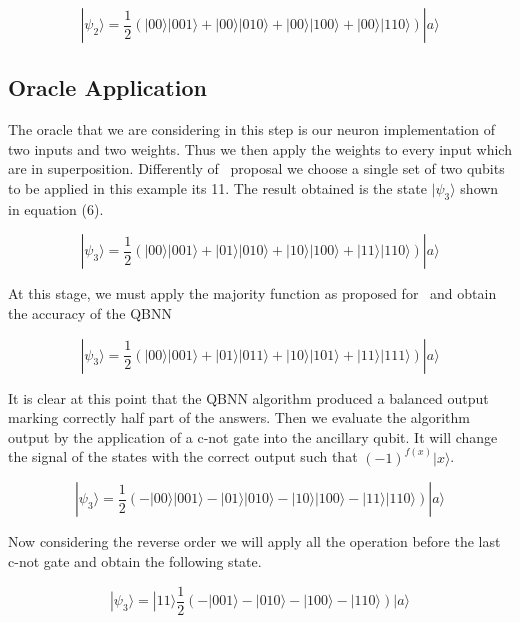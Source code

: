 \documentclass[conference]{IEEEtran}
\begin{document}
\begin{equation}
|\psi_2\rangle = \frac{1}{2}(|00\rangle|001\rangle + |00\rangle|010\rangle + |00\rangle|100\rangle + |00\rangle|110\rangle)
|a\rangle
\end{equation}

\subsection{Oracle Application}\label{subsec:oracle-application}

The oracle that we are considering in this step is our neuron implementation of two inputs and two weights.
Thus we then apply the weights to every input which are in superposition.
Differently of~\cite{fawaz2019training} proposal we choose a single set of two qubits to be applied in this example its 11.
The result obtained is the state $|\psi_3\rangle$ shown in equation (6).

\begin{equation}
|\psi_3\rangle = \frac{1}{2}(|00\rangle|001\rangle + |01\rangle|010\rangle + |10\rangle|100\rangle + |11\rangle|110\rangle)
|a\rangle
\end{equation}

At this stage, we must apply the majority function as proposed for~\cite{fawaz2019training} and obtain the accuracy of
the QBNN

\begin{equation}
|\psi_3\rangle = \frac{1}{2}(|00\rangle|001\rangle + |01\rangle|011\rangle + |10\rangle|101\rangle + |11\rangle|111\rangle)
|a\rangle
\end{equation}

It is clear at this point that the QBNN algorithm produced a balanced output marking correctly half part of the answers.
Then we evaluate the algorithm output by the application of a c-not gate into the ancillary qubit.
It will change the signal of the states with the correct output such that \((-1)^{f(x)}|x\rangle\).

\begin{equation}
|\psi_3\rangle = \frac{1}{2}(-|00\rangle|001\rangle - |01\rangle|010\rangle - |10\rangle|100\rangle - |11\rangle|110\rangle)
|a\rangle
\end{equation}

Now considering the reverse order we will apply all the operation before the last c-not gate and obtain the following state.

\begin{equation}
|\psi_3\rangle = |11\rangle\frac{1}{2}(-|001\rangle - |010\rangle - |100\rangle - |110\rangle)
|a\rangle
\end{equation}
\end{document}
